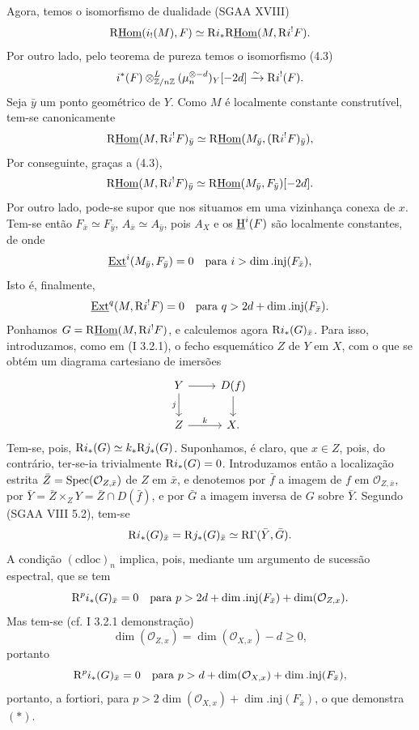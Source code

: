 Agora, temos o isomorfismo de dualidade (SGAA XVIII)
\[
        \mathrm{R}\underline{\operatorname{Hom}}(i_!(M),F)\simeq \mathrm{R} i_*\mathrm{R}\underline{\operatorname{Hom}}(M,\mathrm{R} i^!F).
\]
Por outro lado, pelo teorema de pureza temos o isomorfismo (4.3)
\[
        i^*(F)\otimes^L_{\mathbb{Z}/n\mathbb{Z}}(\mu_n^{\otimes -d})_Y[-2d]\xrightarrow{\sim}\mathrm{R} i^!(F).
\]
Seja $\bar{y}$ um ponto geométrico de $Y$. Como $M$ é localmente constante construtível, tem-se canonicamente
\[
        \mathrm{R}\underline{\operatorname{Hom}}(M,\mathrm{R} i^!F)_{\bar{y}}\simeq \mathrm{R}\underline{\operatorname{Hom}}(M_{\bar{y}},(\mathrm{R} i^!F)_{\bar{y}}),
\]
Por conseguinte, graças a (4.3),
\[
        \mathrm{R}\underline{\operatorname{Hom}}(M,\mathrm{R} i^!F)_{\bar{y}}\simeq \mathrm{R}\underline{\operatorname{Hom}}(M_{\bar{y}},F_{\bar{y}})[-2d].
\]
Por outro lado, pode-se supor que nos situamos em uma vizinhança conexa de $x$. Tem-se então $F_{\bar{x}}\simeq F_{\bar{y}}$, $A_{\bar{x}}\simeq A_{\bar{y}}$, pois $A_X$ e os $\underline{\mathrm H}^i(F)$ são localmente constantes, de onde
\[
        \underline{\operatorname{Ext}}^i(M_{\bar{y}},F_{\bar{y}})=0\quad\hbox{para }i>\dim.\mathrm{inj}(F_{\bar{x}}),
\]
Isto é, finalmente,
\[
        \underline{\operatorname{Ext}}^{q}(M,\mathrm{R} i^!F)=0\quad\hbox{para }q>2d+\dim.\mathrm{inj}(F_{\bar{x}}).
\]
Ponhamos $G=\mathrm{R}\underline{\operatorname{Hom}}(M,\mathrm{R} i^!F)$, e calculemos agora $\mathrm{R} i_*(G)_{\bar{x}}$. Para isso, introduzamos, como em (I 3.2.1), o fecho esquemático $Z$ de $Y$ em $X$, com o que se obtém um diagrama cartesiano de imersões
\[
\begin{tikzcd}
Y \arrow[r] \arrow[d,"j"'] & D(f) \arrow[d]\\
Z \arrow[r,"k"] & X.
\end{tikzcd}
\]
Tem-se, pois, $\mathrm{R} i_*(G)\simeq k_*\mathrm{R} j_*(G)$. Suponhamos, é claro, que $x\in Z$, pois, do contrário, ter-se-ia trivialmente $\mathrm{R} i_*(G)=0$. Introduzamos então a localização estrita $\bar{Z}=\operatorname{Spec}(\mathcal{O}_{Z,\bar{x}})$ de $Z$ em $\bar{x}$, e denotemos por $\bar{f}$ a imagem de $f$ em $\mathcal{O}_{Z,\bar{x}}$, por $\bar{Y}=\bar{Z}\times_ZY=\bar{Z}\cap D(\bar{f})$, e por $\bar{G}$ a imagem inversa de $G$ sobre $\bar{Y}$. Segundo (SGAA VIII 5.2), tem-se
\[
        \mathrm{R} i_*(G)_{\bar{x}}=\mathrm{R} j_*(G)_{\bar{x}}\simeq \mathrm{R}\Gamma(\bar{Y},\bar{G}).
\]
A condição $(\mathrm{cdloc})_n$ implica, pois, mediante um argumento de sucessão espectral, que se tem
\[
        \mathrm{R}^p i_*(G)_{\bar{x}}=0\quad\hbox{para }p>2d+\dim.\mathrm{inj}(F_{\bar{x}})+\dim(\mathcal{O}_{Z,x}).
\]
Mas tem-se (cf. I 3.2.1 demonstração)
\[
        \dim(\mathcal{O}_{Z,x})=\dim(\mathcal{O}_{X,x})-d\geq0,
\]
portanto
\[
        \mathrm{R}^p i_*(G)_{\bar{x}}=0\quad\hbox{para }p>d+\dim(\mathcal{O}_{X,x})+\dim.\mathrm{inj}(F_{\bar{x}}),
\]
portanto, a fortiori, para $p>2\dim(\mathcal{O}_{X,x})+\dim.\mathrm{inj}(F_{\bar{x}})$, o que demonstra $(*)$.

